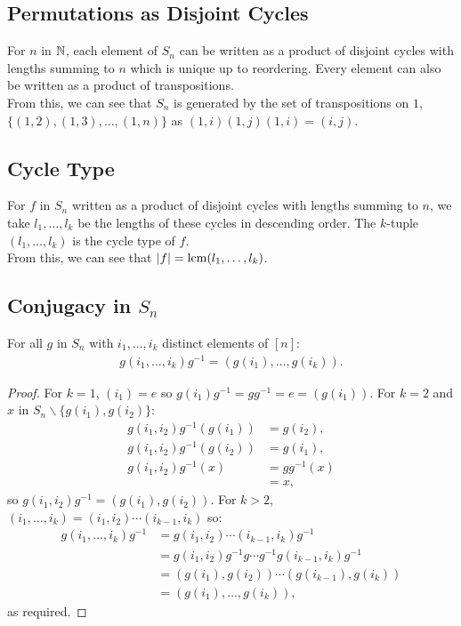 \subsection{Permutations as Disjoint Cycles} \label{4.1}

For $n$ in $\mathbb{N}$, each element of $S_n$ can be written as a product of
disjoint cycles with lengths summing to $n$ which is unique up to reordering.
Every element can also be written as a product of transpositions.
\\[\baselineskip]
From this, we can see that $S_n$ is generated by the set of transpositions on
$1$, $\{(1, 2), (1, 3), \ldots, (1, n)\}$ as $(1, i)(1, j)(1, i) = (i, j)$.

\subsection{Cycle Type} \label{4.2}

For $f$ in $S_n$ written as a product of disjoint cycles with lengths summing
to $n$, we take $l_1, \ldots, l_k$ be the lengths of these cycles in
descending order. The $k$-tuple $(l_1, \ldots, l_k)$ is the cycle type of $f$.
\\[\baselineskip]
From this, we can see that $|f| = \operatorname{lcm}(l_1, \ldots, l_k)$.

\subsection{Conjugacy in $S_n$} \label{4.4}

For all $g$ in $S_n$ with $i_1, \ldots, i_k$ distinct elements of $[n]$: 
\begin{align*}
    g(i_1, \ldots, i_k)g^{-1} = (g(i_1), \ldots, g(i_k)).
\end{align*}

\begin{proof}
    For $k = 1$, $(i_1) = e$ so $g(i_1)g^{-1} = gg^{-1} = e = (g(i_1))$.
    For $k = 2$ and $x$ in $S_n \backslash \{g(i_1), g(i_2)\}$: \begin{align*}
        g(i_1, i_2)g^{-1}(g(i_1)) 
        &= g(i_2), \\
        g(i_1, i_2)g^{-1}(g(i_2)) 
        &= g(i_1), \\
        g(i_1, i_2)g^{-1}(x) 
        &= gg^{-1}(x) \\
        &= x,
    \end{align*} so $g(i_1, i_2)g^{-1} = (g(i_1), g(i_2))$. For $k > 2$,
    $(i_1, \ldots, i_k) = (i_1, i_2)\cdots(i_{k - 1}, i_k)$ so: \begin{align*}
        g(i_1, \ldots, i_k)g^{-1} 
        &= g(i_1, i_2)\cdots(i_{k - 1}, i_k)g^{-1}\\
        &= g(i_1, i_2)g^{-1}g \cdots g^{-1}g(i_{k - 1}, i_k)g^{-1}\\
        &= (g(i_1), g(i_2)) \cdots (g(i_{k - 1}), g(i_k)) \\
        &= (g(i_1), \ldots, g(i_k)),
    \end{align*} as required.
\end{proof}

